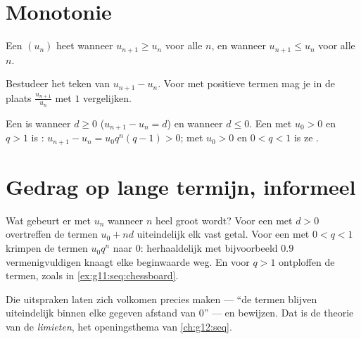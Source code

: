 \section{Monotonie}

\begin{definition}\label{def:g11:seq:monotone}
Een  $(u_n)$ heet \emph{} wanneer $u_{n+1} \geq u_n$ voor alle
$n$, en \emph{} wanneer $u_{n+1} \leq u_n$ voor alle $n$.
\end{definition}

\begin{method}\label{met:g11:seq:monotonicity}
Bestudeer het teken van $u_{n+1} - u_n$. Voor  met positieve termen mag
je in de plaats $\frac{u_{n+1}}{u_n}$ met $1$ vergelijken.
\end{method}

\begin{example}
Een  is  wanneer $d \geq 0$ ($u_{n+1} - u_n = d$) en
 wanneer $d \leq 0$. Een  met $u_0 > 0$ en $q > 1$ is
: $u_{n+1} - u_n = u_0 q^n (q - 1) > 0$; met $u_0 > 0$ en
$0 < q < 1$ is ze .
\end{example}

\section{Gedrag op lange termijn, informeel}

Wat gebeurt er met $u_n$ wanneer $n$ heel groot wordt? Voor een  met $d > 0$ overtreffen de termen $u_0 + nd$ uiteindelijk elk vast getal.
Voor een  met $0 < q < 1$ krimpen de termen $u_0 q^n$ naar
$0$: herhaaldelijk met bijvoorbeeld $0.9$ vermenigvuldigen knaagt elke
beginwaarde weg. En voor $q > 1$ ontploffen de termen, zoals in
\cref{ex:g11:seq:chessboard}.

\begin{remark}
Die uitspraken laten zich volkomen precies maken --- ``de termen blijven
uiteindelijk binnen elke gegeven afstand van $0$'' --- en bewijzen. Dat is de
theorie van de \emph{limieten}, het openingsthema van \cref{ch:g12:seq}.
\end{remark}

